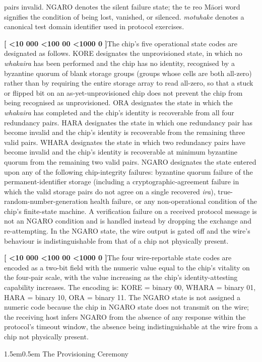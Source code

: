 \documentclass[12pt,letterpaper]{article}
\makeatletter
\newcounter{para}
\newcommand{\padzero}{%
  \ifnum\value{para}<10 000\else%
  \ifnum\value{para}<100 00\else%
  \ifnum\value{para}<1000 0\else%
  \fi\fi\fi}
\newcommand{\para}{%
  \refstepcounter{para}\noindent\textbf{[\padzero\arabic{para}]}\hspace{0.5em}\ignorespaces}
\renewcommand{\subsection}{\@startsection{subsection}{2}{0pt}%
  {1.5em}{0.5em}%
  {\normalfont\normalsize\bfseries}}
\makeatother
\begin{document}
pairs invalid. NGARO denotes the silent failure state; the te reo M\=aori word signifies the condition of being lost, vanished, or silenced. \emph{motuhake} denotes a canonical test domain identifier used in protocol exercises.

\para The chip's five operational state codes are designated as follows. KORE designates the unprovisioned state, in which no \emph{whakaira} has been performed and the chip has no identity, recognised by a byzantine quorum of blank storage groups (groups whose cells are both all-zero) rather than by requiring the entire storage array to read all-zero, so that a stuck or flipped bit on an as-yet-unprovisioned chip does not prevent the chip from being recognised as unprovisioned. ORA designates the state in which the \emph{whakaira} has completed and the chip's identity is recoverable from all four redundancy pairs. HARA designates the state in which one redundancy pair has become invalid and the chip's identity is recoverable from the remaining three valid pairs. WHARA designates the state in which two redundancy pairs have become invalid and the chip's identity is recoverable at minimum byzantine quorum from the remaining two valid pairs. NGARO designates the state entered upon any of the following chip-integrity failures: byzantine quorum failure of the permanent-identifier storage (including a cryptographic-agreement failure in which the valid storage pairs do not agree on a single recovered \emph{ira}), true-random-number-generation health failure, or any non-operational condition of the chip's finite-state machine. A verification failure on a received protocol message is not an NGARO condition and is handled instead by dropping the exchange and re-attempting. In the NGARO state, the wire output is gated off and the wire's behaviour is indistinguishable from that of a chip not physically present.

\para The four wire-reportable state codes are encoded as a two-bit field with the numeric value equal to the chip's vitality on the four-pair scale, with the value increasing as the chip's identity-attesting capability increases. The encoding is: KORE = binary 00, WHARA = binary 01, HARA = binary 10, ORA = binary 11. The NGARO state is not assigned a numeric code because the chip in NGARO state does not transmit on the wire; the receiving host infers NGARO from the absence of any response within the protocol's timeout window, the absence being indistinguishable at the wire from a chip not physically present.

\subsection{The Provisioning Ceremony}
\end{document}
